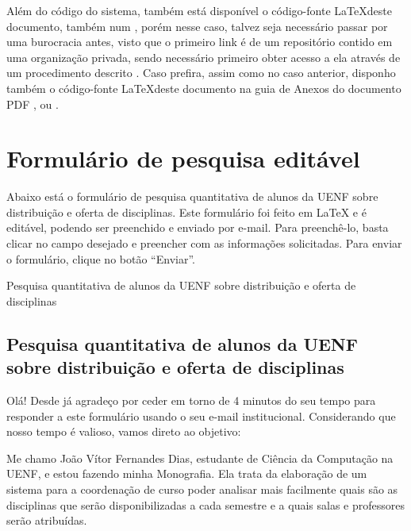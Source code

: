 \begin{apendicesenv}
  Além do código do sistema, também está disponível o código-fonte \LaTeX deste documento, também num , porém nesse caso, talvez seja necessário passar por uma burocracia antes, visto que o primeiro link é de um repositório contido em uma organização privada, sendo necessário primeiro obter acesso a ela através de um procedimento descrito . Caso prefira, assim como no caso anterior, disponho também o código-fonte \LaTeX deste documento na guia de Anexos do documento PDF , ou .

  \chapter{Formulário de pesquisa editável} \label{apendice:FormularioPesquisaQuantitativaEditavel}

  Abaixo está o formulário de pesquisa quantitativa de alunos da UENF sobre distribuição e oferta de disciplinas. Este formulário foi feito em \LaTeX{} e é editável, podendo ser preenchido e enviado por e-mail. Para preenchê-lo, basta clicar no campo desejado e preencher com as informações solicitadas. Para enviar o formulário, clique no botão ``Enviar''.

  \begin{Form}[action=mailto:joaovitorfd2000@gmail.com, encoding=html, method=post]

    Pesquisa quantitativa de alunos da UENF sobre distribuição e oferta de disciplinas

    \section*{Pesquisa quantitativa de alunos da UENF sobre distribuição e oferta de disciplinas}

    Olá! Desde já agradeço por ceder em torno de 4 minutos do seu tempo para responder a este formulário usando o seu e-mail institucional. Considerando que nosso tempo é valioso, vamos direto ao objetivo:

    Me chamo João Vítor Fernandes Dias, estudante de Ciência da Computação na UENF, e estou fazendo minha Monografia. Ela trata da elaboração de um sistema para a coordenação de curso poder analisar mais facilmente quais são as disciplinas que serão disponibilizadas a cada semestre e a quais salas e professores serão atribuídas.


\end{Form}
\end{apendicesenv}
